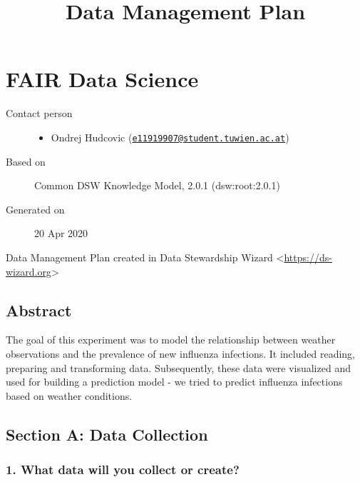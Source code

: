 \documentclass[
]{article}
\title{Data Management Plan}
\author{}
\date{}
\providecommand{\tightlist}{%
  \setlength{\itemsep}{0pt}\setlength{\parskip}{0pt}}
\begin{document}
\maketitle

\hypertarget{fair-data-science}{%
\section{FAIR Data Science}\label{fair-data-science}}

\begin{description}
\item[Contact person]
\begin{itemize}
\tightlist
\item
  {Ondrej Hudcovic}
  ({\href{mailto:e11919907@student.tuwien.ac.at}{\nolinkurl{e11919907@student.tuwien.ac.at}}})
\end{itemize}
\item[Based on]
Common DSW Knowledge Model, 2.0.1 ({{dsw}:{root}:{2.0.1}})
\item[Generated on]
20 Apr 2020
\end{description}

Data Management Plan created in Data Stewardship Wizard
\textless{}\url{https://ds-wizard.org}\textgreater{}

\hypertarget{abstract}{%
\subsection{Abstract}\label{abstract}}

The goal of this experiment was to model the relationship between
weather observations and the prevalence of new influenza infections. It
included reading, preparing and transforming data. Subsequently, these
data were visualized and used for building a prediction model - we tried
to predict influenza infections based on weather conditions.

\hypertarget{dmp-content}{}
\hypertarget{sec-data-collection}{}
\hypertarget{section-a-data-collection}{%
\subsection{Section A: Data
Collection}\label{section-a-data-collection}}

\hypertarget{q-what-data}{}
\hypertarget{what-data-will-you-collect-or-create}{%
\subsubsection{1. What data will you collect or
create?}\label{what-data-will-you-collect-or-create}}
\end{document}
